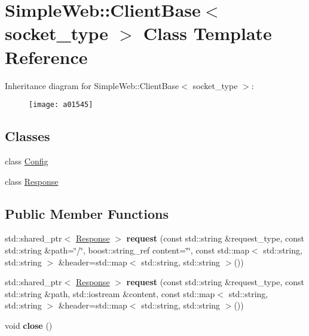 \hypertarget{a01545}{}\section{Simple\+Web\+:\+:Client\+Base$<$ socket\+\_\+type $>$ Class Template Reference}
\label{a01545}
Inheritance diagram for Simple\+Web\+:\+:Client\+Base$<$ socket\+\_\+type $>$\+:\begin{figure}[H]
\begin{center}
\leavevmode
\texttt{[image: a01545]}
\end{center}
\end{figure}
\subsection*{Classes}
\begin{DoxyCompactItemize}
\item 
class \hyperlink{a01553}{Config}
\item 
class \hyperlink{a01549}{Response}
\end{DoxyCompactItemize}
\subsection*{Public Member Functions}
\begin{DoxyCompactItemize}
\item 
\mbox{\label{a01545_ac8a838ace77f0a1a19b8cb03bdba7e74}} 
std\+::shared\+\_\+ptr$<$ \hyperlink{a01549}{Response} $>$ {\bfseries request} (const std\+::string \&request\+\_\+type, const std\+::string \&path=\char`\"{}/\char`\"{}, boost\+::string\+\_\+ref content=\char`\"{}\char`\"{}, const std\+::map$<$ std\+::string, std\+::string $>$ \&header=std\+::map$<$ std\+::string, std\+::string $>$())
\item 
\mbox{\label{a01545_aca6cb17dbea9adf0cf1daf9d1ea70f76}} 
std\+::shared\+\_\+ptr$<$ \hyperlink{a01549}{Response} $>$ {\bfseries request} (const std\+::string \&request\+\_\+type, const std\+::string \&path, std\+::iostream \&content, const std\+::map$<$ std\+::string, std\+::string $>$ \&header=std\+::map$<$ std\+::string, std\+::string $>$())
\item 
\mbox{\label{a01545_ad21735a9bda2fae6aedd811efae981e1}} 
void {\bfseries close} ()
\end{DoxyCompactItemize}
